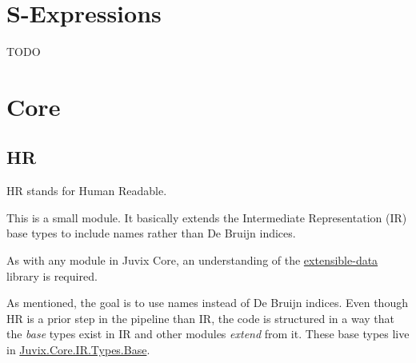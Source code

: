 \documentclass[acmsmall]{acmart}
\numberwithin{figure}{subsection}
\begin{document}
\section{S-Expressions}

TODO



\section{Core}

\subsection{HR}

HR stands for Human Readable.

This is a small module. It basically extends the Intermediate Representation (IR) base types to include names rather than De Bruijn indices.

As with any module in Juvix Core, an understanding of the \href{https://heliaxdev.github.io/extensible-data/Extensible.html}{extensible-data} library is required.

As mentioned, the goal is to use names instead of De Bruijn indices. Even though HR is a prior step in the pipeline than IR, the code is structured in a way that the \textit{base} types exist in IR and other modules \textit{extend} from it. These base types live in \href{https://github.com/heliaxdev/juvix/blob/develop/library/Core/src/Juvix/Core/IR/Types/Base.hs}{Juvix.Core.IR.Types.Base}. 
    
\end{document}
